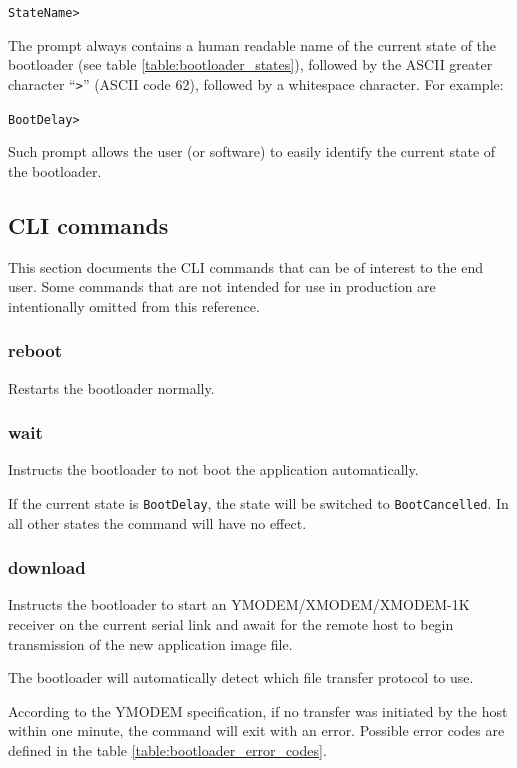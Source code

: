 \documentclass{zubaxdoc}
\begin{document}
\verb|StateName> |

The prompt always contains a human readable name of the current state of the bootloader
(see table \ref{table:bootloader_states}),
followed by the ASCII greater character ``\verb|>|'' (ASCII code 62), followed by a whitespace character.
For example:

\verb|BootDelay> |

Such prompt allows the user (or software) to easily identify the current state of the bootloader.

\subsection{CLI commands}

This section documents the CLI commands that can be of interest to the end user.
Some commands that are not intended for use in production are intentionally omitted from this reference.

\subsubsection{reboot}

Restarts the bootloader normally.

\subsubsection{wait}

Instructs the bootloader to not boot the application automatically.

If the current state is \verb|BootDelay|, the state will be switched to \verb|BootCancelled|.
In all other states the command will have no effect.

\subsubsection{download}

Instructs the bootloader to start an YMODEM/XMODEM/XMODEM-1K receiver on the current serial link
and await for the remote host to begin transmission of the new application image file.

The bootloader will automatically detect which file transfer protocol to use.

According to the YMODEM specification, if no transfer was initiated by the host within one minute,
the command will exit with an error.
Possible error codes are defined in the table \ref{table:bootloader_error_codes}.
\end{document}
